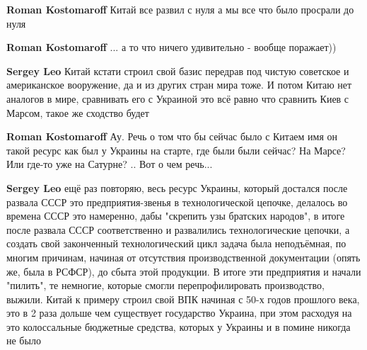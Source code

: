 \begin{itemize}
\begin{itemize}
\textbf{Roman Kostomaroff} Китай все развил с нуля а мы все что было просрали до нуля

 
\textbf{Roman Kostomaroff} ... а то что ничего удивительно - вообще поражает))

 
\textbf{Sergey Leo} Китай кстати строил свой базис передрав под чистую
советское и американское вооружение, да и из других стран мира тоже. И потом
Китаю нет аналогов в мире, сравнивать его с Украиной это всё равно что сравнить
Киев с Марсом, такое же сходство будет

 
\textbf{Roman Kostomaroff} Ау. Речь о том что бы сейчас было с Китаем имя он
такой ресурс как был у Украины на старте, где были были сейчас? На Марсе? Или
где-то уже на Сатурне? .. Вот о чем речь...

 
\textbf{Sergey Leo} ещё раз повторяю, весь ресурс Украины, который достался
после развала СССР это предприятия-звенья в технологической цепочке, делалось
во времена СССР это намеренно, дабы "скрепить узы братских народов", в итоге
после развала СССР соответственно и развалились технологические цепочки, а
создать свой законченный технологический цикл задача была неподъёмная, по
многим причинам, начиная от отсутствия производственной документации (опять же,
была в РСФСР), до сбыта этой продукции. В итоге эти предприятия и начали
"пилить", те немногие, которые смогли перепрофилировать производство, выжили.
Китай к примеру строил свой ВПК начиная с 50-х годов прошлого века, это в 2
раза дольше чем существует государство Украина, при этом расходуя на это
колоссальные бюджетные средства, которых у Украины и в помине никогда не было



\end{itemize}
\end{itemize}
